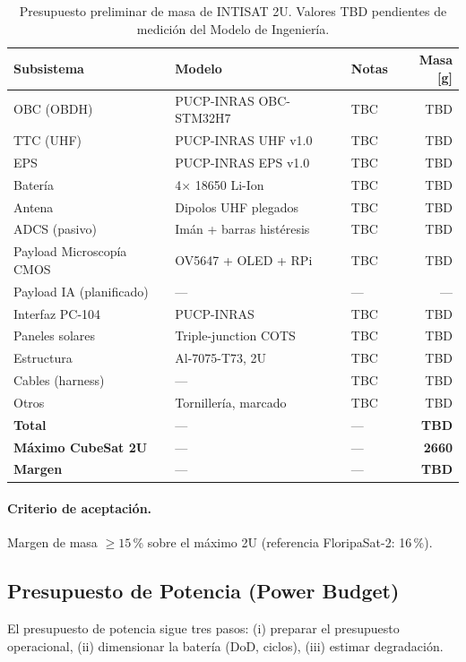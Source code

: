 \begin{table}[h]
\centering
\caption{Presupuesto preliminar de masa de INTISAT 2U. Valores TBD pendientes de medición del Modelo de Ingeniería.}
\label{tab:mass_budget}
\begin{tabular}{lll@{}r}
\toprule
\textbf{Subsistema} & \textbf{Modelo} & \textbf{Notas} & \textbf{Masa [g]} \\
\midrule
OBC (OBDH)              & PUCP-INRAS OBC-STM32H7 & TBC & TBD \\
TTC (UHF)               & PUCP-INRAS UHF v1.0     & TBC & TBD \\
EPS                     & PUCP-INRAS EPS v1.0     & TBC & TBD \\
Batería                 & 4$\times$ 18650 Li-Ion  & TBC & TBD \\
Antena                  & Dipolos UHF plegados    & TBC & TBD \\
ADCS (pasivo)           & Imán + barras histéresis & TBC & TBD \\
Payload Microscopía CMOS & OV5647 + OLED + RPi      & TBC & TBD \\
Payload IA (planificado) & ---                     & --- & --- \\
Interfaz PC-104         & PUCP-INRAS              & TBC & TBD \\
Paneles solares         & Triple-junction COTS    & TBC & TBD \\
Estructura              & Al-7075-T73, 2U         & TBC & TBD \\
Cables (harness)        & ---                     & TBC & TBD \\
Otros                   & Tornillería, marcado    & TBC & TBD \\
\midrule
\textbf{Total}                  & --- & --- & \textbf{TBD} \\
\textbf{Máximo CubeSat 2U}      & --- & --- & \textbf{2660} \\
\textbf{Margen}                 & --- & --- & \textbf{TBD} \\
\bottomrule
\end{tabular}
\end{table}

\paragraph{Criterio de aceptación.} Margen de masa $\ge 15$\,\% sobre el máximo 2U (referencia FloripaSat-2: 16\,\%).

\subsection{Presupuesto de Potencia (Power Budget)}
El presupuesto de potencia sigue tres pasos: (i) preparar el presupuesto operacional, (ii) dimensionar la batería (DoD, ciclos), (iii) estimar degradación.

